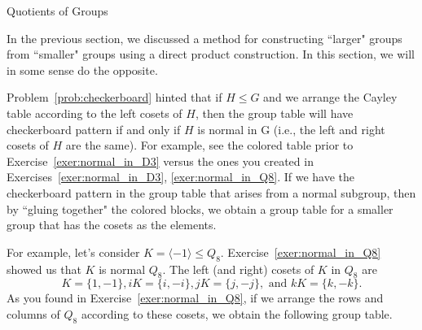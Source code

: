 \begin{section}{Quotients of Groups}

In the previous section, we discussed a method for constructing ``larger" groups from ``smaller" groups using a direct product construction.  In this section, we will in some sense do the opposite.

Problem~\ref{prob:checkerboard} hinted that if \(H\leq G\) and we arrange the Cayley table according to the left cosets of \(H\), then the group table will have checkerboard pattern if and only if \(H\) is normal in G (i.e., the left and right cosets of \(H\) are the same).  For example, see the colored table prior to Exercise~\ref{exer:normal_in_D3} versus the ones you created in Exercises~\ref{exer:normal_in_D3}, \ref{exer:normal_in_Q8}.  If we have the checkerboard pattern in the group table that arises from a normal subgroup, then by ``gluing together" the colored blocks, we obtain a group table for a smaller group that has the cosets as the elements. 

For example, let's consider \(K=\langle -1\rangle \leq Q_8\).  Exercise~\ref{exer:normal_in_Q8} showed us that \(K\) is normal \(Q_8\).  The left (and right) cosets of \(K\) in \(Q_8\) are
\[
K=\{1,-1\}, iK=\{i,-i\}, jK=\{j,-j\}, \text{ and } kK=\{k,-k\}.
\]
As you found in Exercise~\ref{exer:normal_in_Q8}, if we arrange the rows and columns of \(Q_8\) according to these cosets, we obtain the following group table.


\end{section}
